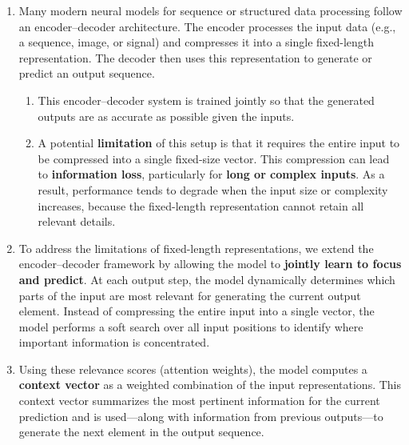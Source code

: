 \begin{enumerate}
    \item Many modern neural models for sequence or structured data processing follow an encoder–decoder architecture.
    The encoder processes the input data (e.g., a sequence, image, or signal) and compresses it into a single fixed-length representation. The decoder then uses this representation to generate or predict an output sequence.
    \hfill \cite{arxiv/1409.0473/NMT-Jointly-Learning-Align-Translate, common/online/chatgpt}
    \begin{enumerate}
        \item This encoder–decoder system is trained jointly so that the generated outputs are as accurate as possible given the inputs. 
        \hfill \cite{arxiv/1409.0473/NMT-Jointly-Learning-Align-Translate, common/online/chatgpt}
        
        \item A potential \textbf{limitation} of this setup is that it requires the entire input to be compressed into a single fixed-size vector. 
        This compression can lead to \textbf{information loss}, particularly for \textbf{long or complex inputs}. 
        As a result, performance tends to degrade when the input size or complexity increases, because the fixed-length representation cannot retain all relevant details.
        \hfill \cite{arxiv/1409.0473/NMT-Jointly-Learning-Align-Translate, common/online/chatgpt}
    \end{enumerate}

    \item To address the limitations of fixed-length representations, we extend the encoder–decoder framework by allowing the model to \textbf{jointly learn to focus and predict}.
    At each output step, the model dynamically determines which parts of the input are most relevant for generating the current output element.
    Instead of compressing the entire input into a single vector, the model performs a soft search over all input positions to identify where important information is concentrated.
    \hfill \cite{arxiv/1409.0473/NMT-Jointly-Learning-Align-Translate, common/online/chatgpt}

    \item Using these relevance scores (attention weights), the model computes a \textbf{context vector} as a weighted combination of the input representations.
    This context vector summarizes the most pertinent information for the current prediction and is used—along with information from previous outputs—to generate the next element in the output sequence.
    \hfill \cite{arxiv/1409.0473/NMT-Jointly-Learning-Align-Translate, common/online/chatgpt}


\end{enumerate}
